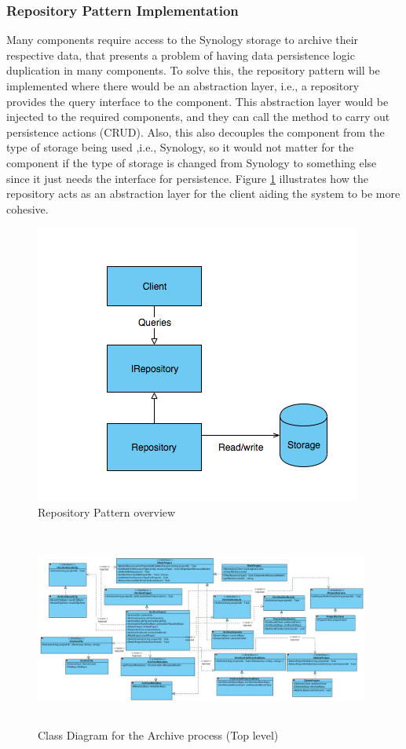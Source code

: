 \subsubsection{Repository Pattern Implementation}
Many components require access to the Synology storage to archive their respective data, that presents a problem of having data
persistence logic duplication in many components. To solve this, the repository pattern will be implemented where there would be an abstraction layer, i.e., a repository
provides the query interface to the component. This abstraction layer would be injected to the required components, and they can call the 
method to carry out persistence actions (CRUD). Also, this also decouples the component from the type of storage being used ,i.e., Synology, so it would not
matter for the component if the type of storage is changed from Synology to something else since it just needs the interface for persistence. Figure 
\ref{fig:repositoryPattern} illustrates how the repository acts as an abstraction layer for the client aiding the system to be more cohesive. 
\begin{figure}[H]
    \centering \includegraphics[scale=0.7]{grafiken/repositoryPattern.png}
    \caption{Repository Pattern overview}
    \label{fig:repositoryPattern}
\end{figure}


\begin{figure}[H]
    \centering \includegraphics[height=6.5cm, angle=90, origin=c, width=11cm]{grafiken/archiveClass.png}
    \caption{Class Diagram for the Archive process (Top level)}
    \label{fig:archiveClassDiagram}
\end{figure}
